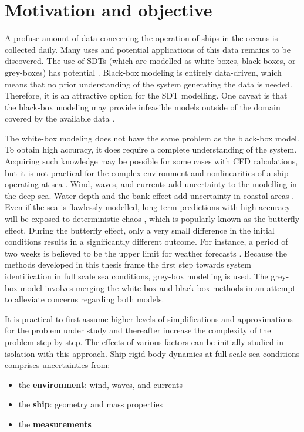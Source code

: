 \section{Motivation and objective}
\label{sec:motivation}
A profuse amount of data concerning the operation of ships in the oceans is collected daily. Many uses and potential applications of this data remains to be discovered. The use of SDTs (which are modelled as white-boxes, black-boxes, or grey-boxes) has potential .
Black-box modeling is entirely data-driven, which means that no prior understanding of the system generating the data is needed. Therefore, it is an attractive option for the SDT modelling. One caveat is that the black-box modeling may provide infeasible models outside of the domain covered by the available data \cite{nielsen_machine_2022}. 

The white-box modeling does not have the same problem as the black-box model. To obtain high accuracy, it does require a complete understanding of the system. Acquiring such knowledge may be possible for some cases with CFD calculations, but it is not practical for the complex environment and nonlinearities of a ship operating at sea \cite{miller_ship_2021}. 
Wind, waves, and currents add uncertainty to the modelling in the deep sea. Water depth and the bank effect add uncertainty in coastal areas \cite{nielsen_machine_2022}. 
Even if the sea is flawlessly modelled, long-term predictions with high accuracy will be exposed to deterministic chaos \cite{lorenz_deterministic_1963}, which is popularly known as the butterfly effect. During the butterfly effect, only a very small difference in the initial conditions results in a significantly different outcome. For instance, a period of two weeks is believed to be the upper limit for weather forecasts  \cite{zhang_what_2019}. Because the methods developed in this thesis frame the first step towards system identification in full scale sea conditions, grey-box modelling is used. The grey-box model involves merging the white-box and black-box methods in an attempt to alleviate concerns regarding both models. 

It is practical to first assume higher levels of simplifications and approximations for the problem under study and thereafter increase the complexity of the problem step by step. The effects of various factors can be initially studied in isolation with this approach. 
Ship rigid body dynamics at full scale sea conditions comprises uncertainties from:
\begin{itemize}
    \item the \textbf{environment}: wind, waves, and currents
    \item the \textbf{ship}: geometry and mass properties
    \item the \textbf{measurements}
\end{itemize}

